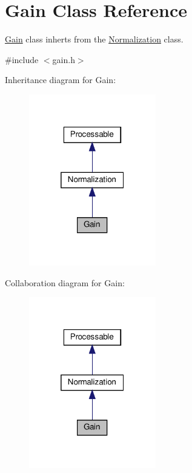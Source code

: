 \hypertarget{classGain}{}\section{Gain Class Reference}
\label{classGain}


\hyperlink{classGain}{Gain} class inherts from the \hyperlink{classNormalization}{Normalization} class.  




{\ttfamily \#include $<$gain.\+h$>$}



Inheritance diagram for Gain\+:
\nopagebreak
\begin{figure}[H]
\begin{center}
\leavevmode
\includegraphics[width=157pt]{dd/da7/classGain__inherit__graph}
\end{center}
\end{figure}


Collaboration diagram for Gain\+:
\nopagebreak
\begin{figure}[H]
\begin{center}
\leavevmode
\includegraphics[width=157pt]{d0/d6d/classGain__coll__graph}
\end{center}
\end{figure}
